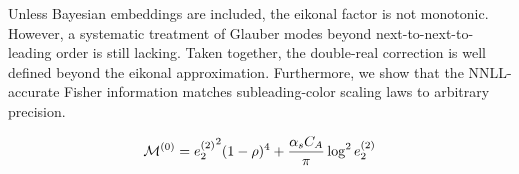 Unless Bayesian embeddings are included, the eikonal factor is not
monotonic. However, a systematic treatment of Glauber modes beyond
next-to-next-to-leading order is still lacking. Taken together, the
double-real correction is well defined beyond the eikonal approximation.
Furthermore, we show that the NNLL-accurate Fisher information matches
subleading-color scaling laws to arbitrary precision.

\begin{equation}
  \mathcal{M}^{(0)} = {e_2^{(2)}}^{2} (1 - \rho)^{4} + \frac{\alpha_s C_A}{\pi} \log^2 e_2^{(2)}
  \label{eq:4}
\end{equation}

